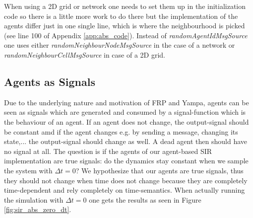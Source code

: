 When using a 2D grid or network one needs to set them up in the initialization code so there is a little more work to do there but the implementation of the agents differ just in one single line, which is where the neighbourhood is picked (see line 100 of Appendix \ref{app:abs_code}). Instead of \textit{randomAgentIdMsgSource} one uses either \textit{randomNeighbourNodeMsgSource} in the case of a network or \textit{randomNeighbourCellMsgSource} in case of a 2D grid.

\subsection{Agents as Signals}
Due to the underlying nature and motivation of FRP and Yampa, agents can be seen as signals which are generated and consumed by a signal-function which is the behaviour of an agent.  If an agent does not change, the output-signal should be constant amd if the agent changes e.g. by sending a message, changing its state,... the output-signal should change as well. A dead agent then should have no signal at all.
The question is if the agents of our agent-based SIR implementation are true signals: do the dynamics stay constant when we sample the system with $\Delta t = 0$? We hypothesize that our agents are true signals, thus they should not change when time does not change because they are completely time-dependent and rely completely on time-semantics. When actually running the simulation with $\Delta t = 0$ one gets the results as seen in Figure \ref{fig:sir_abs_zero_dt}.


